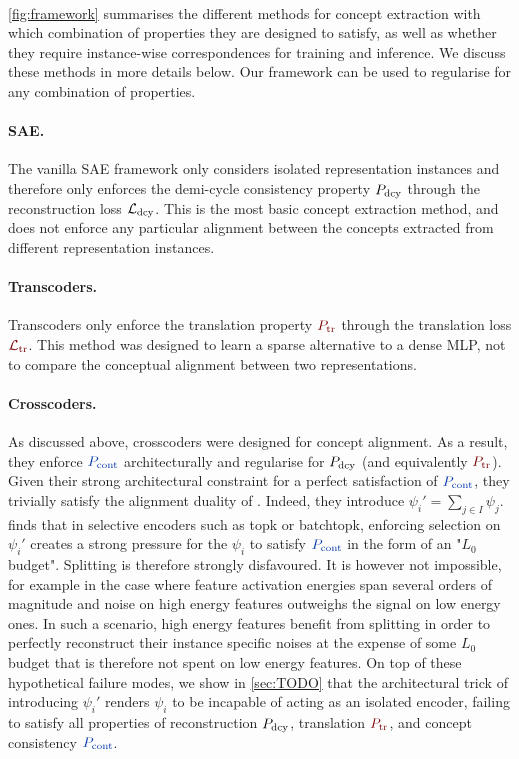 \documentclass{article}
\begin{document}
\paragraph{} \cref{fig:framework} summarises the different methods for concept extraction with which combination of properties they are designed to satisfy, as well as whether they require instance-wise correspondences for training and inference. We discuss these methods in more details below. Our framework can be used to regularise for any combination of properties.

\paragraph{SAE.} The vanilla SAE framework only considers isolated representation instances and therefore only enforces the demi-cycle consistency property $P_{\mathrm{dcy}}$ through the reconstruction loss $\mathcal{L}_{\mathrm{dcy}}$. This is the most basic concept extraction method, and does not enforce any particular alignment between the concepts extracted from different representation instances.

\paragraph{Transcoders.} Transcoders \citep{TODO:transcoder} only enforce the translation property $\Ptr$ through the translation loss $\Ltr$. This method was designed to learn a sparse alternative to a dense MLP, not to compare the conceptual alignment between two representations.

\paragraph{Crosscoders.} As discussed above, crosscoders \citep{TODO} were designed for concept alignment. As a result, they enforce $\Pcont$ architecturally and regularise for $P_{\mathrm{dcy}}$ (and equivalently $\Ptr$). Given their strong architectural constraint for a perfect satisfaction of $\Pcont$, they trivially satisfy the alignment duality of . Indeed, they introduce $\psi_i' = \sum_{j \in I} \psi_j$. \citet{TODO:clement} finds that in selective encoders such as topk or batchtopk, enforcing selection on $\psi_i'$ creates a strong pressure for the $\psi_i$ to satisfy $\Pcont$ in the form of an "$L_0$ budget". Splitting is therefore strongly disfavoured. It is however not impossible, for example in the case where feature activation energies span several orders of magnitude and noise on high energy features outweighs the signal on low energy ones. In such a scenario, high energy features benefit from splitting in order to perfectly reconstruct their instance specific noises at the expense of some $L_0$ budget that is therefore not spent on low energy features. On top of these hypothetical failure modes, we show in \cref{sec:TODO} that the architectural trick of introducing $\psi_i'$ renders $\psi_i$ to be incapable of acting as an isolated encoder, failing to satisfy all properties of reconstruction $P_{\mathrm{dcy}}$, translation $\Ptr$, and concept consistency $\Pcont$.
\end{document}
